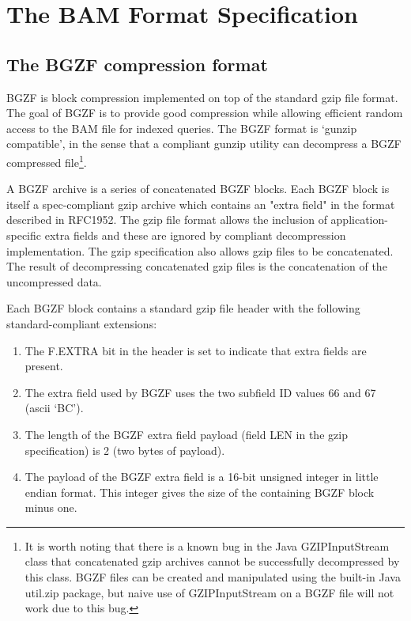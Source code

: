 \documentclass[10pt]{article}
\begin{document}
\pagebreak

\section{The BAM Format Specification}

\subsection{The BGZF compression format}

BGZF is block compression implemented on top of the standard gzip file
format. The goal of BGZF is to provide good compression while allowing
efficient random access to the BAM file for indexed queries. The BGZF
format is `gunzip compatible', in the sense that a compliant gunzip
utility can decompress a BGZF compressed file\footnote{It is worth noting that there is a known bug in the Java {\sf
  GZIPInputStream} class that concatenated gzip archives cannot be
successfully decompressed by this class. BGZF files can be created and
manipulated using the built-in Java {\sf util.zip} package, but naive
use of {\sf GZIPInputStream} on a BGZF file will not work due to this
bug.}.

A BGZF archive is a series of concatenated BGZF blocks. Each BGZF block
is itself a spec-compliant gzip archive which contains an "extra field"
in the format described in RFC1952. The gzip file format allows the
inclusion of application-specific extra fields and these are ignored by
compliant decompression implementation. The gzip specification also
allows gzip files to be concatenated. The result of decompressing
concatenated gzip files is the concatenation of the uncompressed data.

Each BGZF block contains a standard gzip file header with the following
standard-compliant extensions:

\begin{enumerate}
\item The {\sf F.EXTRA} bit in the header is set to indicate that extra
  fields are present.
\item The extra field used by BGZF uses the two subfield ID values 66 and 67 (ascii `BC').
\item The length of the BGZF extra field payload (field {\sf LEN} in the
  gzip specification) is 2 (two bytes of payload).
\item The payload of the BGZF extra field is a 16-bit unsigned integer
  in little endian format. This integer gives the size of the containing
  BGZF block minus one.
\end{enumerate}
\end{document}
